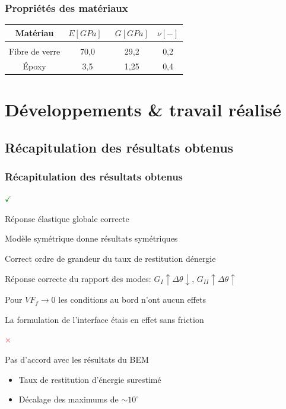 \documentclass[first,firstsupp,lastsupp,handout,last,hyperref,table]{ETHclass}
\begin{document}
\begin{frame}
\frametitle{Propri\'et\'es des mat\'eriaux}
\vspace{-0.7cm}
\footnotesize
\centering
\captionsetup[figure]{font=scriptsize,labelfont=scriptsize}
\begin{table}[htbp]

  \centering
    \begin{tabular}{cccc}

    \textbf{Mat\'eriau} & \textbf{$E\left[GPa\right]$}\ & \textbf{$G\left[GPa\right]$} & \textbf{$\nu\left[-\right]$} \\[3pt]
    \midrule\\[12pt]
    Fibre de verre    & 70,0  & 29,2   & 0,2  \\[16pt]
    \'Epoxy    & 3,5    & 1,25   & 0,4  

    \end{tabular}%
  \label{tab:phaseprop}%
\end{table}%
\end{frame}

\section{D\'eveloppements \& travail r\'ealis\'e}

\subsection[R\'esultats obtenus]{R\'ecapitulation des r\'esultats obtenus}

\begin{frame}
\frametitle{R\'ecapitulation des r\'esultats obtenus}
\vspace{-0.25cm}
\scriptsize
\begin{list}{\Large\textcolor{green}{$\mathbf{\checkmark}$}}{}  
\item R\'eponse \'elastique globale correcte
\item Mod\`ele sym\'etrique donne r\'esultats sym\'etriques
\item Correct ordre de grandeur du taux de restitution d\'energie
\item R\'eponse correcte du rapport des modes: $G_{I}\uparrow\Delta\theta\downarrow$, $G_{II}\uparrow\Delta\theta\uparrow$
\item Pour $VF_{f}\to 0$ les conditions au bord n'ont aucun effets
\item La formulation de l'interface \'etais en effet sans friction
\end{list}
\begin{list}{\Huge\textcolor{red}{$\mathbf{\times}$}}{}  
\item Pas d'accord avec les r\'esultats du BEM  
\begin{itemize}[label=]
\item Taux de restitution d'\'energie surestim\'e
\item D\'ecalage des maximums de $\sim 10^{\circ}$
\end{itemize}
\end{list}
\end{frame}
\end{document}
